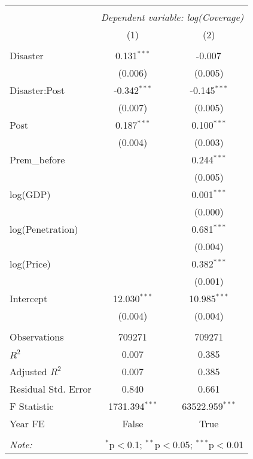 
\begin{tabular}{@{\extracolsep{5pt}}lcc}
\\[-1.8ex]\hline
\hline \\[-1.8ex]
& \multicolumn{2}{c}{\textit{Dependent variable: log(Coverage)}} \
\cr \cline{2-3}
\\[-1.8ex] & (1) & (2) \\
\hline \\[-1.8ex]
 Disaster & 0.131$^{***}$ & -0.007$^{}$ \\
& (0.006) & (0.005) \\
 Disaster:Post & -0.342$^{***}$ & -0.145$^{***}$ \\
& (0.007) & (0.005) \\
 Post & 0.187$^{***}$ & 0.100$^{***}$ \\
& (0.004) & (0.003) \\
 Prem\_before & & 0.244$^{***}$ \\
& & (0.005) \\
 log(GDP) & & 0.001$^{***}$ \\
& & (0.000) \\
 log(Penetration) & & 0.681$^{***}$ \\
& & (0.004) \\
 log(Price) & & 0.382$^{***}$ \\
& & (0.001) \\
Intercept & 12.030$^{***}$ & 10.985$^{***}$ \\
& (0.004) & (0.004) \\
\hline \\[-1.8ex]
 Observations & 709271 & 709271 \\
 $R^2$ & 0.007 & 0.385 \\
 Adjusted $R^2$ & 0.007 & 0.385 \\
 Residual Std. Error & 0.840  & 0.661  \\
 F Statistic & 1731.394$^{***}$  & 63522.959$^{***}$  \\
 Year FE & False & True\\
 \hline
\hline \\[-1.8ex]
\textit{Note:} & \multicolumn{2}{r}{$^{*}$p$<$0.1; $^{**}$p$<$0.05; $^{***}$p$<$0.01} \\
\end{tabular}
